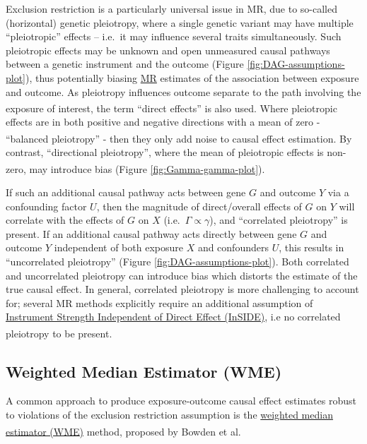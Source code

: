 \documentclass[
]{article}
\begin{document}
Exclusion restriction is a particularly universal issue in MR, due to so-called (horizontal) genetic pleiotropy, where a single genetic variant may have multiple ``pleiotropic'' effects -- i.e.~it may influence several traits simultaneously. Such pleiotropic effects may be unknown and open unmeasured causal pathways between a genetic instrument and the outcome (Figure \ref{fig:DAG-assumptions-plot}), thus potentially biasing \hyperref[acronyms_MR]{MR} estimates of the association between exposure and outcome. As pleiotropy influences outcome separate to the path involving the exposure of interest, the term ``direct effects'' is also used\textsuperscript{}. Where pleiotropic effects are in both positive and negative directions with a mean of zero - ``balanced pleiotropy'' - then they only add noise to causal effect estimation\textsuperscript{}. By contrast, ``directional pleiotropy'', where the mean of pleiotropic effects is non-zero, may introduce bias\textsuperscript{} (Figure \ref{fig:Gamma-gamma-plot}).

If such an additional causal pathway acts between gene \(G\) and outcome \(Y\) via a confounding factor \(U\), then the magnitude of direct/overall effects of \(G\) on \(Y\) will correlate with the effects of \(G\) on \(X\) (i.e.~\(\Gamma \propto \gamma\)), and ``correlated pleiotropy'' is present. If an additional causal pathway acts directly between gene \(G\) and outcome \(Y\) independent of both exposure \(X\) and confounders \(U\), this results in ``uncorrelated pleiotropy'' (Figure \ref{fig:DAG-assumptions-plot}). Both correlated and uncorrelated pleiotropy can introduce bias which distorts the estimate of the true causal effect. In general, correlated pleiotropy is more challenging to account for; several MR methods explicitly require an additional assumption of \hyperref[acronyms_InSIDE]{Instrument Strength Independent of Direct Effect (InSIDE)}, i.e no correlated pleiotropy to be present\textsuperscript{}.

\subsection{Weighted Median Estimator (WME)}\label{weighted-median-estimator-wme}

A common approach to produce exposure-outcome causal effect estimates robust to violations of the exclusion restriction assumption is the \hyperref[acronyms_WME]{weighted median estimator (WME)} method, proposed by Bowden et al\textsuperscript{}.
\end{document}
